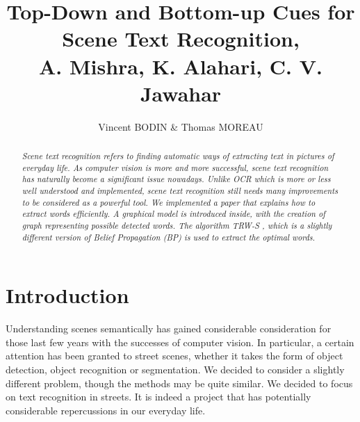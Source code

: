 \documentclass[10pt,a4paper]{article}
\title{Top-Down and Bottom-up Cues for Scene Text Recognition, \\
A. Mishra, K. Alahari, C. V. Jawahar}
\author{Vincent BODIN \& Thomas MOREAU}
\date{}
\begin{document}
\maketitle

\hrulefill
\begin{abstract}
\emph{Scene text recognition refers to finding automatic ways of extracting text in pictures of everyday life. As computer vision is more and more successful, scene text recognition has naturally become a significant issue nowadays. Unlike OCR which is more or less well understood and implemented, scene text recognition still needs many improvements to be considered as a powerful tool. We implemented a paper \cite{Mis} that explains how to extract words efficiently. A graphical model is introduced inside, with the creation of graph representing possible detected words. The algorithm TRW-S \cite{Kol}, which is a slightly different version of Belief Propagation (BP) is used to extract the optimal words.}
\end{abstract}









\section*{Introduction}

Understanding scenes semantically has gained considerable consideration for those last few years with the successes of computer vision. In particular, a certain attention has been granted to street scenes, whether it takes the form of object detection, object recognition or segmentation. We decided to consider a slightly different problem, though the methods may be quite similar. We decided to focus on text recognition in streets. It is indeed a project that has potentially considerable repercussions in our everyday life. \\
\end{document}
